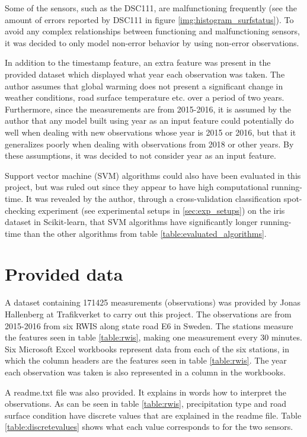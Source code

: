 	Some of the sensors, such as the DSC111, are malfunctioning frequently (see the amount of errors reported by DSC111 in figure \ref{img:histogram_surfstatus}). To avoid any complex relationships between functioning and malfunctioning sensors, it was decided to only model non-error behavior by using non-error observations. 

	In addition to the timestamp feature, an extra feature was present in the provided dataset which displayed what year each observation was taken. The author assumes that global warming does not present a significant change in weather conditions, road surface temperature etc. over a period of two years. Furthermore, since the measurements are from 2015-2016, it is assumed by the author that any model built using year as an input feature could potentially do well when dealing with new observations whose year is 2015 or 2016, but that it generalizes poorly when dealing with observations from 2018 or other years. By these assumptions, it was decided to not consider year as an input feature. 

	Support vector machine (SVM) algorithms could also have been evaluated in this project, but was ruled out since they appear to have high computational running-time. It was revealed by the author, through a cross-validation classification spot-checking experiment (see experimental setups in \ref{sec:exp_setups}) on the iris dataset in Scikit-learn, that SVM algorithms have significantly longer running-time than the other algorithms from table \ref{table:evaluated_algorithms}.

\section{Provided data} \label{sec:provided_data}
	A dataset containing 171425 measurements (observations) was provided by Jonas Hallenberg at Trafikverket to carry out this project. The observations are from 2015-2016 from six RWIS along state road E6 in Sweden. The stations measure the features seen in table \ref{table:rwis}, making one measurement every 30 minutes. Six Microsoft Excel workbooks represent data from each of the six stations, in which the column headers are the features seen in table \ref{table:rwis}. The year each observation was taken is also represented in a column in the workbooks.

	A readme.txt file was also provided. It explains in words how to interpret the observations. As can be seen in table \ref{table:rwis}, precipitation type and road surface condition have discrete values that are explained in the readme file. Table \ref{table:discretevalues} shows what each value corresponds to for the two sensors.
		
